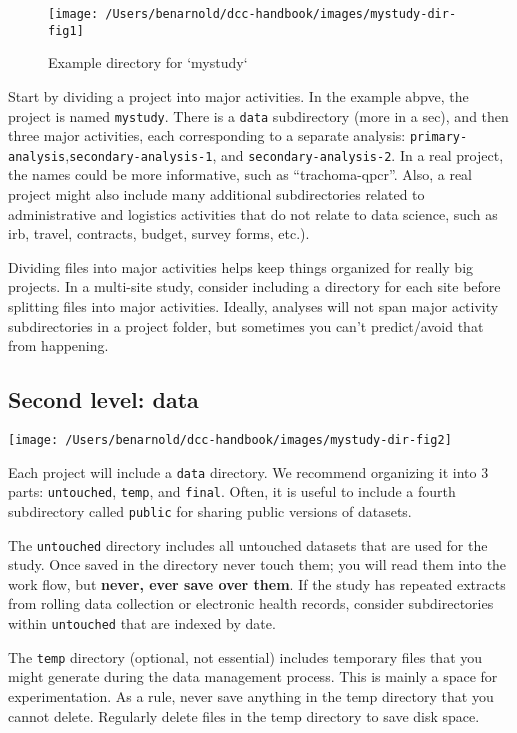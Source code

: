\documentclass[
]{book}
\begin{document}
\begin{figure}
\texttt{[image: /Users/benarnold/dcc-handbook/images/mystudy-dir-fig1]} \caption{Example directory for `mystudy`}\label{fig:dir-fig1}
\end{figure}

Start by dividing a project into major activities. In the example abpve, the project is named \texttt{mystudy}. There is a \texttt{data} subdirectory (more in a sec), and then three major activities, each corresponding to a separate analysis: \texttt{primary-analysis},\texttt{secondary-analysis-1}, and \texttt{secondary-analysis-2}. In a real project, the names could be more informative, such as ``trachoma-qpcr''. Also, a real project might also include many additional subdirectories related to administrative and logistics activities that do not relate to data science, such as irb, travel, contracts, budget, survey forms, etc.).

Dividing files into major activities helps keep things organized for really big projects. In a multi-site study, consider including a directory for each site before splitting files into major activities. Ideally, analyses will not span major activity subdirectories in a project folder, but sometimes you can't predict/avoid that from happening.

\hypertarget{second-level-data}{%
\subsection{Second level: data}\label{second-level-data}}

\texttt{[image: /Users/benarnold/dcc-handbook/images/mystudy-dir-fig2]}

Each project will include a \texttt{data} directory. We recommend organizing it into 3 parts: \texttt{untouched}, \texttt{temp}, and \texttt{final}. Often, it is useful to include a fourth subdirectory called \texttt{public} for sharing public versions of datasets.

The \texttt{untouched} directory includes all untouched datasets that are used for the study. Once saved in the directory never touch them; you will read them into the work flow, but \textbf{never, ever save over them}. If the study has repeated extracts from rolling data collection or electronic health records, consider subdirectories within \texttt{untouched} that are indexed by date.

The \texttt{temp} directory (optional, not essential) includes temporary files that you might generate during the data management process. This is mainly a space for experimentation. As a rule, never save anything in the temp directory that you cannot delete. Regularly delete files in the temp directory to save disk space.
\end{document}
